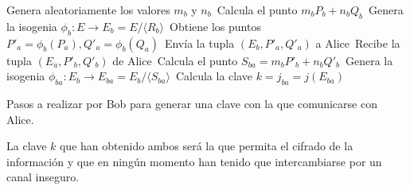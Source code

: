 \documentclass[
  a4paper,
  12pt,
  spanish,
]{scrartcl}
\begin{document}
\begin{algorithm}[h]
  Genera aleatoriamente los valores \(m_b\) y \(n_b\)\,\;
  Calcula el punto \(m_bP_b + n_bQ_b\)\,\;
  Genera la isogenia \(\phi_b: E \to E_b = E/\langle R_b \rangle\)\,\;
  Obtiene los puntos \(P'_a = \phi_b(P_a), Q'_a = \phi_b(Q_a)\)\,\;
  Envía la tupla \((E_b, P'_a, Q'_a)\) a Alice\,\;
  Recibe la tupla \((E_a, P'_b, Q'_b)\) de Alice\,\;
  Calcula el punto \(S_{ba} = m_bP'_b + n_bQ'_b\)\,\;
  Genera la isogenia \(\phi_{ba} : E_b \to E_{ba} = E_b/\langle S_{ba} \rangle\)\,\;
  Calcula la clave \(k = j_{ba} = j(E_{ba})\)\,\;
  
  \caption{Pasos a realizar por Bob para generar una clave con la que comunicarse con Alice.}
  \label{algo:sidh-bob}
\end{algorithm}

La clave \(k\) que han obtenido ambos será la que permita el cifrado de la información y que en ningún momento han tenido que intercambiarse por un canal inseguro.




\newpage
\printbibliography
\end{document}

